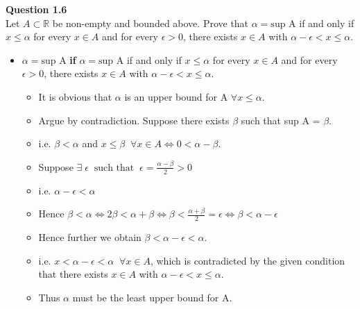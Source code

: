 \documentclass[12pt]{article}
\newcommand{\R}{\mathbb{R}}
\begin{document}
\noindent \textbf{Question 1.6}\\
Let $A \subset \R$ be non-empty and bounded above. Prove that $\alpha = \text{sup A}$ if and only if $x \le \alpha$ for every $x \in A$ and for every $\epsilon > 0$, there exists $x \in A$ with $\alpha - \epsilon < x \le \alpha$.
\begin{itemize}

    \item $\alpha = \text{sup A}$ \textbf{if} $\alpha = \text{sup A}$ if and only if $x \le \alpha$ for every $x \in A$ and for every $\epsilon > 0$, there exists $x \in A$ with $\alpha - \epsilon < x \le \alpha$.
        \begin{itemize}
            \item It is obvious that $\alpha$ is an upper bound for A $\forall x \le \alpha$.
            \item Argue by contradiction. Suppose there exists $\beta$ such that sup A = $\beta$.
            \item i.e. $\beta < \alpha$ and $x \le \beta \;\; \forall x \in A \Leftrightarrow 0 < \alpha - \beta$.
            \item Suppose $\exists\; \epsilon\;\; \text{such that}\;\; \epsilon = \frac{\alpha - \beta}{2} > 0$
            \item i.e. $\alpha - \epsilon < \alpha$
            \item Hence $\beta < \alpha \Leftrightarrow 2\beta < \alpha + \beta \Leftrightarrow \beta < \frac{\alpha + \beta}{2} = \epsilon \Leftrightarrow \beta < \alpha - \epsilon$
            \item Hence further we obtain $\beta < \alpha - \epsilon < \alpha$.
            \item i.e. $x < \alpha - \epsilon < \alpha \;\; \forall x \in A$, which is contradicted by the given condition that there exists $x \in A$ with $\alpha - \epsilon < x \le \alpha$.
            \item Thus $\alpha$ must be the least upper bound for A.
        \end{itemize} 
 

\end{itemize}
\end{document}
